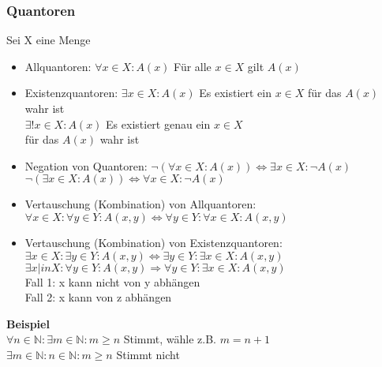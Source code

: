 \documentclass{article}
\begin{document}
	\subsubsection{Quantoren}
	Sei X eine Menge
	\begin{itemize}
	\item Allquantoren: $\forall x \in X: A(x)$ \tabto{6cm} Für alle $x \in X$ gilt $A(x)$
	\item Existenzquantoren: \tabto{3.2cm} $\exists x \in X: A(x)$ \tabto{6cm} Es existiert ein $x \in X$ für das $A(x)$ \\
	\tabto{6cm} wahr ist\\
	\tabto{3.2cm} $\exists! x \in X: A(x)$ \tabto{6cm} Es existiert genau ein $x \in X$ \\
	\tabto{6cm} für das $A(x)$ wahr ist
	\item Negation von Quantoren: \tabto{5cm} $\lnot (\forall x \in X: A(x)) \Leftrightarrow \exists x \in X: \lnot A(x)$\\
	\tabto{5cm} $\lnot (\exists x \in X: A(x)) \Leftrightarrow \forall x \in X: \lnot A(x)$
	\item Vertauschung (Kombination) von Allquantoren:\\
	\tabto{2cm} $\forall x \in X: \forall y \in Y: A(x,y) \Leftrightarrow \forall y \in Y: \forall x \in X: A(x,y)$
	\item Vertauschung (Kombination) von Existenzquantoren: \\
	\tabto{2cm} $\exists x \in X: \exists y \in Y: A(x,y) \Leftrightarrow \exists y \in Y: \exists x \in X: A(x,y)$
	\tabto{2cm} $\exists x |in X: \forall y \in Y: A(x,y) \Rightarrow \forall y \in Y: \exists x \in X: A(x,y)$\\
	Fall 1: x kann nicht von y abhängen\\
	Fall 2: x kann von z abhängen 
	\end{itemize}
	\begin{tcolorbox}[width=\linewidth, sharp corners=all, colback=white!95!black]
	\textbf{Beispiel} \\
	\tabto{1cm} $\forall n \in \mathbb{N}: \exists m \in \mathbb{N} : m \geq n$ \tabto{6cm} Stimmt, wähle z.B. $m=n+1$\\
	\tabto{1cm} $\exists  m \in \mathbb{N} : n \in \mathbb{N} : m \geq n$ \tabto{6cm} Stimmt nicht
	\end{tcolorbox}
	
\end{document}
